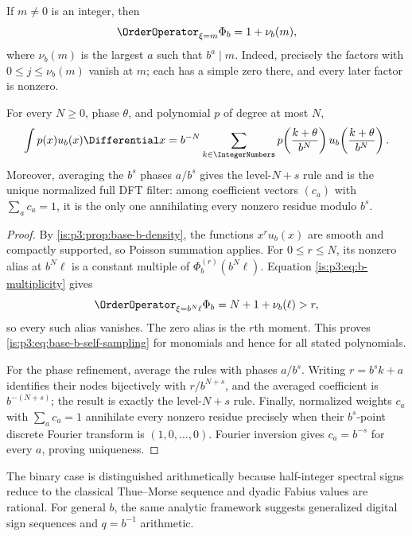 If $m\ne0$ is an integer, then
\begin{equation}
 \OrderOperator_{\xi=m}\Phi_b=1+\nu_b(m),
 \label{is:p3:eq:b-multiplicity}
\end{equation}
where $\nu_b(m)$ is the largest $a$ such that $b^a\mid m$.
Indeed, precisely the factors with $0\le j\le\nu_b(m)$ vanish at $m$; each
has a simple zero there, and every later factor is nonzero.

\begin{theorem}
\label{is:p3:thm:base-b}
For every $N\ge0$, phase $\theta$, and polynomial $p$ of degree at most $N$,
\begin{equation}
 \int p(x)u_b(x)\Differential x
 =b^{-N}\sum_{k\in\IntegerNumbers}
 p\!\left(\frac{k+\theta}{b^N}\right)
 u_b\!\left(\frac{k+\theta}{b^N}\right).
 \label{is:p3:eq:base-b-self-sampling}
\end{equation}
Moreover, averaging the $b^s$ phases $a/b^s$ gives the level-$N+s$ rule and is
the unique normalized full DFT filter: among coefficient vectors $(c_a)$ with
$\sum_a c_a=1$, it is the only one annihilating every nonzero residue modulo
$b^s$.
\end{theorem}

\begin{proof}
By \cref{is:p3:prop:base-b-density}, the functions
$x^ru_b(x)$ are smooth and compactly supported, so Poisson summation applies.
For $0\le r\le N$, its nonzero alias at $b^N\ell$ is a constant multiple of
$\Phi_b^{(r)}(b^N\ell)$.  Equation \eqref{is:p3:eq:b-multiplicity} gives
\[
 \OrderOperator_{\xi=b^N\ell}\Phi_b
 =N+1+\nu_b(\ell)>r,
\]
so every such alias vanishes.  The zero alias is the $r$th moment.  This proves
\eqref{is:p3:eq:base-b-self-sampling} for monomials and hence for all stated
polynomials.

For the phase refinement, average the rules with phases $a/b^s$.  Writing
$r=b^sk+a$ identifies their nodes bijectively with $r/b^{N+s}$, and the
averaged coefficient is $b^{-(N+s)}$; the result is exactly the level-$N+s$
rule.  Finally, normalized weights $c_a$ with $\sum_a c_a=1$ annihilate every
nonzero residue precisely when their $b^s$-point discrete Fourier transform is
$(1,0,\ldots,0)$.  Fourier
inversion gives $c_a=b^{-s}$ for every $a$, proving uniqueness.
\end{proof}

The binary case is distinguished arithmetically because half-integer spectral signs reduce to the classical Thue--Morse sequence and dyadic Fabius values are rational.  For general $b$, the same analytic framework suggests generalized digital sign sequences and $q=b^{-1}$ arithmetic.


